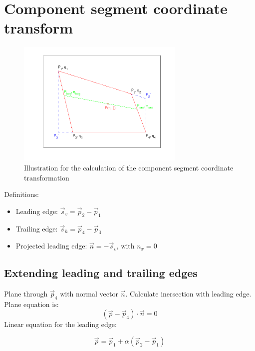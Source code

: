 \section{Component segment coordinate transform}

\begin{figure}[htb]
  \centering
  \includegraphics[trim=1cm 1cm 1cm 0.5cm, clip=true,width = 8cm]{gfx/compSegTheo}
	\caption{Illustration for the calculation of the component segment coordinate transformation}
	\label{fig:cs_surf}
\end{figure}

Definitions:
\begin{itemize}
	\item Leading edge:  $ \vec s_v = \vec p_2 - \vec p_1 $
	\item Trailing edge: $ \vec s_h = \vec p_4 - \vec p_3 $
	\item Projected leading edge:   $\vec n = -\vec s_v$, with $n_x = 0$  
\end{itemize}


\subsection{Extending leading and trailing edges}
Plane through $\vec p_4$ with normal vector $\vec n$. Calculate inersection with leading edge. Plane equation is:
\begin{equation}
(\vec p - \vec p_4) \cdot \vec n = 0
\label{eq:plane}
\end{equation}
 Linear equation for the leading edge:
 
\begin{equation}
\vec p = \vec p_1 + \alpha (\vec p_2 - \vec p_1)
\label{eq:lin_eq1}
\end{equation}


